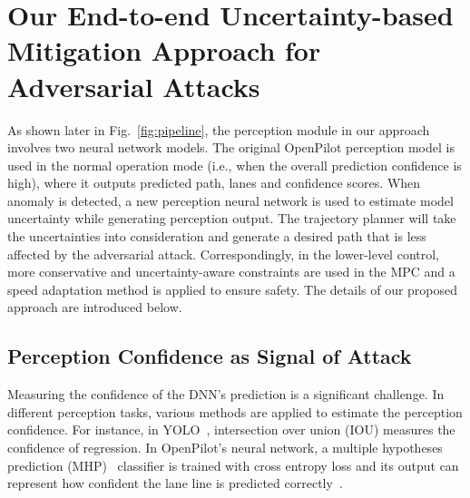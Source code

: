 \section{Our End-to-end Uncertainty-based Mitigation Approach for Adversarial Attacks}
\label{sec:our_approach}

As shown later in Fig.~\ref{fig:pipeline}, the perception module in our approach involves two neural network models. The original OpenPilot perception model is used in the normal operation mode (i.e., when the overall prediction confidence is high), where it outputs predicted path, lanes and confidence scores. %
When anomaly is detected, a new perception neural network is used to estimate model uncertainty while generating perception output. 
The trajectory planner will take the uncertainties into consideration and generate a desired path that is less affected by the adversarial attack. Correspondingly, in the lower-level control, more conservative and uncertainty-aware constraints are used in the MPC and a speed adaptation method is applied to ensure safety. The details of our proposed approach are introduced below.






\subsection{Perception Confidence as Signal of Attack}


Measuring the confidence of the DNN's prediction is a significant challenge. In different perception tasks, various methods are applied to estimate the perception confidence. For instance, in YOLO~\cite{redmon2018yolov3}, intersection over union (IOU) measures the confidence of regression. In OpenPilot's neural network, a multiple hypotheses prediction (MHP)~\cite{rupprecht2017learning} classifier is trained with cross entropy loss and its output can represent how confident the lane line is predicted correctly~\cite{ramos2018deconstructing}. 

